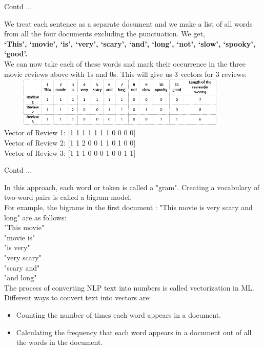 \documentclass{beamer}
\begin{document}
\begin{frame}{Contd ...}
	\begin{flushleft}
		We treat each sentence as a separate document and we make a list of all words from all the four documents excluding the punctuation. We get,\\
\vspace{5pt}
\textbf{‘This’, ‘movie’, ‘is’, ‘very’, ‘scary’, ‘and’, ‘long’, ‘not’,  ‘slow’, ‘spooky’,  ‘good’.}\\
\vspace{10pt}
We can now take each of these words and mark their occurrence in the three movie reviews above with 1s and 0s. This will give us 3 vectors for 3 reviews:\\
\vspace{5pt}
\includegraphics[height=2.4cm, width=12cm]{BOW_table}\\
Vector of Review 1: [1 1 1 1 1 1 1 0 0 0 0] \\
Vector of Review 2: [1 1 2 0 0 1 1 0 1 0 0] \\
Vector of Review 3: [1 1 1 0 0 0 1 0 0 1 1]
\end{flushleft}
\end{frame}

\begin{frame}{Contd ...}
\begin{flushleft}
In this approach, each word or token is called a "gram". Creating a vocabulary of two-word pairs is called a bigram model. \\
For example, the bigrams in the first document : "This movie is very scary and long" are as follows:\\
"This movie"\\
"movie is"\\
"is very"\\
"very scary"\\
"scary and"\\
"and long"\\
The process of converting NLP text into numbers is called vectorization in ML. Different ways to convert text into vectors are:
	\begin{itemize}
		\item Counting the number of times each word appears in a document.
		\item Calculating the frequency that each word appears in a document out of all the words in the document. 
	\end{itemize}
\end{flushleft}
\end{frame}
\end{document}
